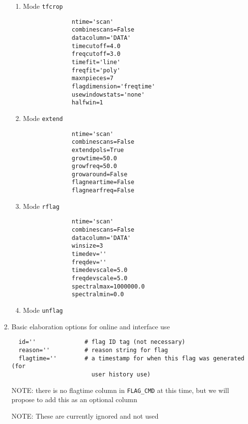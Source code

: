 \begin{enumerate}
\begin{enumerate}
\item Mode {\tt tfcrop}
\small
\begin{verbatim}
              ntime='scan'
              combinescans=False
              datacolumn='DATA' 
              timecutoff=4.0 
              freqcutoff=3.0
              timefit='line'
              freqfit='poly'
              maxnpieces=7 
              flagdimension='freqtime' 
              usewindowstats='none'
              halfwin=1 
\end{verbatim}
\normalsize  
         
\item Mode {\tt extend}
\small
\begin{verbatim}
              ntime='scan'
              combinescans=False
              extendpols=True
              growtime=50.0
              growfreq=50.0
              growaround=False
              flagneartime=False
              flagnearfreq=False
\end{verbatim}
\normalsize  
 
\item Mode {\tt rflag}
\small
\begin{verbatim}
              ntime='scan'
              combinescans=False
              datacolumn='DATA'
              winsize=3
              timedev=''
              freqdev=''
              timedevscale=5.0
              freqdevscale=5.0
              spectralmax=1000000.0
              spectralmin=0.0
\end{verbatim}
\normalsize  
              
\item Mode {\tt unflag}
              
\end{enumerate}
              
\item Basic elaboration options for online and interface use

\small
\begin{verbatim}
  id=''              # flag ID tag (not necessary)
  reason=''          # reason string for flag
  flagtime=''        # a timestamp for when this flag was generated (for 
                       user history use)
\end{verbatim}
\normalsize

NOTE: there is no flagtime column in {\tt FLAG\_CMD} at this time, but we
will propose to add this as an optional column

NOTE: These are currently ignored and not used


\end{enumerate}
